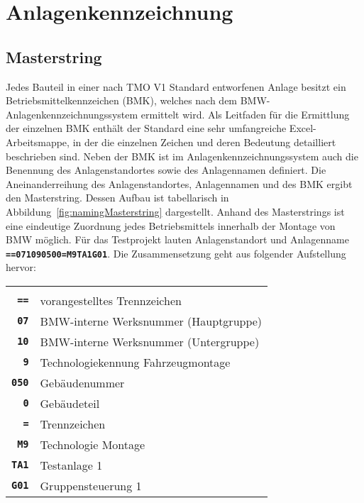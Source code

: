 


\section{Anlagenkennzeichnung}
\label{sec:naming}

\subsection*{Masterstring}
\label{subsec:masterstring}




Jedes Bauteil in einer nach TMO V1 Standard entworfenen Anlage besitzt ein Betriebsmittelkennzeichen (BMK), welches nach dem BMW-Anlagenkennzeichnungssystem ermittelt wird. Als Leitfaden für die Ermittlung der einzelnen BMK enthält der Standard eine sehr umfangreiche Excel-Arbeitsmappe, in der die einzelnen Zeichen und deren Bedeutung detailliert beschrieben sind.
Neben der BMK ist im Anlagenkennzeichnungssystem auch die Benennung des Anlagenstandortes sowie des Anlagennamen definiert. Die Aneinanderreihung des Anlagenstandortes, Anlagennamen und des BMK ergibt den Masterstring. Dessen Aufbau ist tabellarisch in Abbildung~\ref{fig:namingMasterstring} dargestellt. Anhand des Masterstrings ist eine eindeutige Zuordnung jedes Betriebsmittels innerhalb der Montage von BMW möglich.
Für das Testprojekt lauten Anlagenstandort und Anlagenname \textbf{\texttt{==071090500=M9TA1G01}}. Die Zusammensetzung geht aus folgender Aufstellung hervor:

\begin{tabularx}{0.92\textwidth}{rX}
  & \\  
  \textbf{\texttt{==}} & vorangestelltes Trennzeichen \\
  \textbf{\texttt{07}} & BMW-interne Werksnummer (Hauptgruppe) \\
  \textbf{\texttt{10}} & BMW-interne Werksnummer (Untergruppe) \\
  \textbf{\texttt{9}} & Technologiekennung Fahrzeugmontage \\
  \textbf{\texttt{050}} & Gebäudenummer \\
  \textbf{\texttt{0}} & Gebäudeteil \\
  \textbf{\texttt{=}} & Trennzeichen \\
  \textbf{\texttt{M9}} & Technologie Montage \\
  \textbf{\texttt{TA1}} & Testanlage 1 \\
  \textbf{\texttt{G01}} & Gruppensteuerung 1
\end{tabularx}

